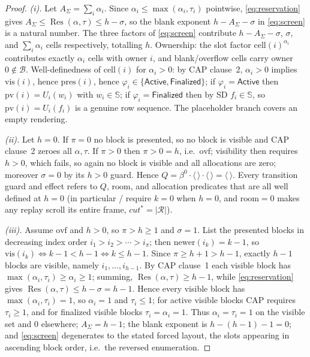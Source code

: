 \documentclass[11pt]{article}
\newcommand{\seq}[1]{\langle #1\rangle}
\newcommand{\emptyseq}{\seq{\,}}
\newcommand{\len}[1]{\lvert #1\rvert}
\newcommand{\cat}{\mathbin{\cdot}}             %
\newcommand{\Blocks}{\mathcal{B}}
\newcommand{\Snap}{\mathbb{S}}
\newcommand{\BlRow}{\square}                   %
\newcommand{\Bcell}{\beta}                     %
\newcommand{\Active}{\mathsf{Active}}
\newcommand{\Finalized}{\mathsf{Finalized}}
\newcommand{\Un}{U}
\newcommand{\pres}{\mathrm{pres}}
\newcommand{\vis}{\mathrm{vis}}
\newcommand{\ovf}{\mathrm{ovf}}
\newcommand{\newer}{\mathrm{newer}}
\newcommand{\RRows}{\mathcal{R}}
\newcommand{\Room}{\mathrm{room}}
\newcommand{\Scr}{Q}
\newcommand{\rcut}{\mathit{cut}}
\newcommand{\ps}{\mathrm{pv}}
\newcommand{\pc}{\mathrm{cell}}
\DeclareMathOperator{\Res}{Res}
\newcommand{\act}[1]{\text{\normalfont\scshape #1}}
\theoremstyle{definition}
\theoremstyle{remark}
\begin{document}
\begin{proof}
\emph{(i).} Let $A_{\Sigma}=\sum_i\alpha_i$. Since
$\alpha_i\le\max(\alpha_i,\tau_i)$ pointwise, \eqref{eq:reservation} gives
$A_{\Sigma}\le\Res(\alpha,\tau)\le h-\sigma$, so the blank exponent
$h-A_{\Sigma}-\sigma$ in \eqref{eq:screen} is a natural number. The three
factors of \eqref{eq:screen} contribute $h-A_{\Sigma}-\sigma$, $\sigma$, and
$\sum_i\alpha_i$ cells respectively, totalling $h$. Ownership: the slot factor
$\pc(i)^{\alpha_i}$ contributes exactly $\alpha_i$ cells with owner $i$, and
blank/overflow cells carry owner $0\notin\Blocks$. Well-definedness of
$\pc(i)$ for $\alpha_i>0$: by CAP clause~2, $\alpha_i>0$ implies $\vis(i)$,
hence $\pres(i)$, hence $\varphi_i\in\{\Active,\Finalized\}$; if
$\varphi_i=\Active$ then $\ps(i)=\Un_i(w_i)$ with $w_i\in\Snap$; if
$\varphi_i=\Finalized$ then by SD $f_i\in\Snap$, so $\ps(i)=\Un_i(f_i)$ is a
genuine row sequence. The placeholder branch covers an empty rendering.

\emph{(ii).} Let $h=0$. If $\pi=0$ no block is presented, so no block is
visible and CAP clause~2 zeroes all $\alpha,\tau$. If $\pi>0$ then
$\pi>0=h$, i.e.\ $\ovf$; visibility then requires $h>0$, which fails, so again
no block is visible and all allocations are zero; moreover $\sigma=0$ by its
$h>0$ guard. Hence $\Scr=\Bcell^{0}\cat\emptyseq\cat\emptyseq=\emptyseq$.
Every transition guard and effect refers to $\Scr$, $\Room$, and allocation
predicates that are all well defined at $h=0$ (in particular
\act{GracefulExit}/\act{DetachExit} require $k=0$ when $h=0$, and
$\Room=0$ makes any replay scroll its entire frame, $\rcut^{*}=\len{\RRows}$).

\emph{(iii).} Assume $\ovf$ and $h>0$, so $\pi>h\ge 1$ and $\sigma=1$. List
the presented blocks in decreasing index order $i_1>i_2>\cdots>i_\pi$; then
$\newer(i_k)=k-1$, so $\vis(i_k)\iff k-1<h-1 \iff k\le h-1$. Since
$\pi\ge h+1>h-1$, exactly $h-1$ blocks are visible, namely
$i_1,\dots,i_{h-1}$. By CAP clause~1 each visible block has
$\max(\alpha_i,\tau_i)\ge\alpha_i\ge 1$; summing,
$\Res(\alpha,\tau)\ge h-1$, while \eqref{eq:reservation} gives
$\Res(\alpha,\tau)\le h-\sigma=h-1$. Hence every visible block has
$\max(\alpha_i,\tau_i)=1$, so $\alpha_i=1$ and $\tau_i\le 1$; for active
visible blocks CAP requires $\tau_i\ge 1$, and for finalized visible blocks
$\tau_i=\alpha_i=1$. Thus $\alpha_i=\tau_i=1$ on the visible set and $0$
elsewhere; $A_{\Sigma}=h-1$; the blank exponent is $h-(h-1)-1=0$; and
\eqref{eq:screen} degenerates to the stated forced layout, the slots appearing
in ascending block order, i.e.\ the reversed enumeration.
\end{proof}
\end{document}
